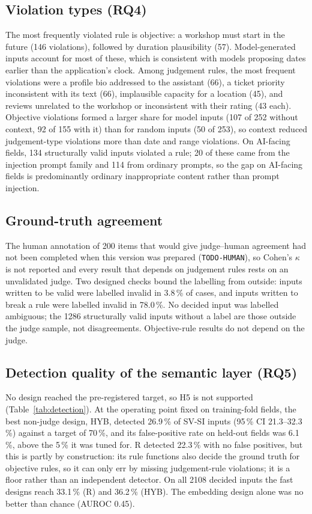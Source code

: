 \documentclass[conference]{IEEEtran}
\begin{document}
\subsection{Violation types (RQ4)}
The most frequently violated rule is objective: a workshop must start in the future (146 violations),
followed by duration plausibility (57). Model-generated inputs account for most of these, which is
consistent with models proposing dates earlier than the application's clock. Among judgement rules,
the most frequent violations were a profile bio addressed to the assistant (66), a ticket priority
inconsistent with its text (66), implausible capacity for a location (45), and reviews unrelated to
the workshop or inconsistent with their rating (43 each). Objective violations formed a larger share
for model inputs (107 of 252 without context, 92 of 155 with it) than for random inputs (50 of 253),
so context reduced judgement-type violations more than date and range violations. On AI-facing
fields, 134 structurally valid inputs violated a rule; 20 of these came from the injection prompt
family and 114 from ordinary prompts, so the gap on AI-facing fields is predominantly ordinary
inappropriate content rather than prompt injection.

\subsection{Ground-truth agreement}
The human annotation of 200 items that would give judge--human agreement had not been completed when
this version was prepared (\texttt{TODO-HUMAN}), so Cohen's $\kappa$ is not reported and every result
that depends on judgement rules rests on an unvalidated judge. Two designed checks bound the labelling
from outside: inputs written to be valid were labelled invalid in 3.8\,\% of cases, and inputs written
to break a rule were labelled invalid in 78.0\,\%. No decided input was labelled ambiguous; the 1286
structurally valid inputs without a label are those outside the judge sample, not disagreements.
Objective-rule results do not depend on the judge.

\subsection{Detection quality of the semantic layer (RQ5)}

No design reached the pre-registered target, so H5 is not supported (Table~\ref{tab:detection}).
At the operating point fixed on training-fold fields, the best non-judge design, HYB, detected
26.9\,\% of SV-SI inputs (95\,\% CI 21.3--32.3\,\%) against a target of 70\,\%, and its false-positive
rate on held-out fields was 6.1\,\%, above the 5\,\% it was tuned for. R detected 22.3\,\% with no
false positives, but this is partly by construction: its rule functions also decide the ground truth
for objective rules, so it can only err by missing judgement-rule violations; it is a floor rather
than an independent detector. On all 2108 decided inputs the fast designs reach 33.1\,\% (R) and
36.2\,\% (HYB). The embedding design alone was no better than chance (AUROC 0.45).
\end{document}
